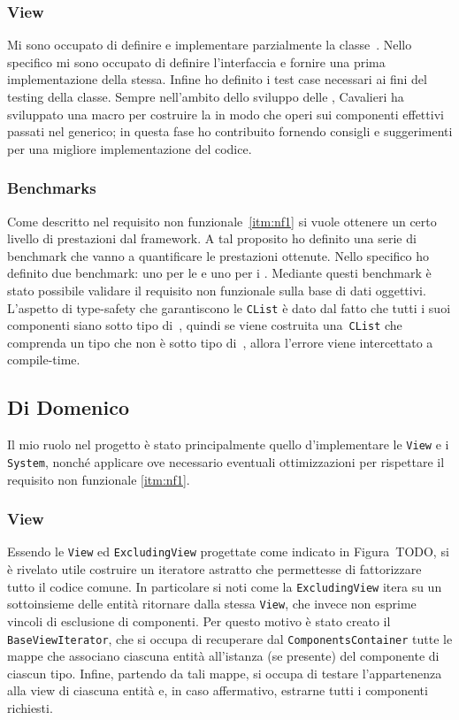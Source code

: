 \subsubsection{View}
Mi sono occupato di definire e implementare parzialmente la classe~\View.
Nello specifico mi sono occupato di definire l'interfaccia e fornire una prima implementazione della stessa.
Infine ho definito i test case necessari ai fini del testing della classe.
Sempre nell'ambito dello sviluppo delle \View, Cavalieri ha sviluppato una macro per costruire la \View in modo che
operi sui componenti effettivi passati nel generico;
in questa fase ho contribuito fornendo consigli e suggerimenti per una migliore implementazione del codice.

\subsubsection{Benchmarks}
Come descritto nel requisito non funzionale~\ref{itm:nf1} si vuole ottenere un certo livello di prestazioni dal
framework.
A tal proposito ho definito una serie di benchmark che vanno a quantificare le prestazioni ottenute.
Nello specifico ho definito due benchmark: uno per le \View e uno per i \System.
Mediante questi benchmark è stato possibile validare il requisito non funzionale sulla base di dati oggettivi.
L'aspetto di type-safety che garantiscono le \texttt{CList} è dato dal fatto che tutti i suoi componenti siano sotto tipo
di~\Component, quindi se viene costruita una~\texttt{CList} che comprenda un tipo che non è sotto tipo di~\Component,
allora l'errore viene intercettato a compile-time.

\subsection{Di Domenico}\label{subsec:nicolò-di-domenico}

Il mio ruolo nel progetto è stato principalmente quello d'implementare le \texttt{View} e i \texttt{System}, nonché
applicare ove necessario eventuali ottimizzazioni per rispettare il requisito non funzionale \ref{itm:nf1}.

\subsubsection{View}

Essendo le \texttt{View} ed \texttt{ExcludingView} progettate come indicato in Figura~TODO, si è rivelato utile costruire un
iteratore astratto che permettesse di fattorizzare tutto il codice comune.
In particolare si noti come la \texttt{ExcludingView} itera su un sottoinsieme delle entità ritornare dalla stessa
\texttt{View}, che invece non esprime vincoli di esclusione di componenti.
Per questo motivo è stato creato il \texttt{BaseViewIterator}, che si occupa di recuperare dal
\texttt{ComponentsContainer} tutte le mappe che associano ciascuna entità all'istanza (se presente) del componente di
ciascun tipo.
Infine, partendo da tali mappe, si occupa di testare l'appartenenza alla view di ciascuna entità e, in caso affermativo,
estrarne tutti i componenti richiesti.

